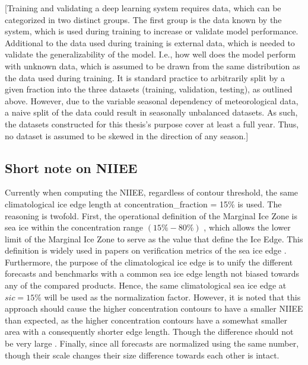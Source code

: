 [Training and validating a deep learning system requires data, which can be categorized in two distinct groups. The first group is the data known by the system, which is used during training to increase or validate model performance. Additional to the data used during training is external data, which is needed to validate the generalizability of the model. I.e., how well does the model perform with unknown data, which is assumed to be drawn from the same distribution as the data used during training. It is standard practice to arbitrarily split by a given fraction into the three datasets (training, validation, testing), as outlined above. However, due to the variable seasonal dependency of meteorological data, a naive split of the data could result in seasonally unbalanced datasets. As such, the datasets constructed for this thesis's purpose cover at least a full year. Thus, no dataset is assumed to be skewed in the direction of any season.] 

\subsection{Short note on NIIEE}

Currently when computing the NIIEE, regardless of contour threshold, the same climatological ice edge length at concentration\_fraction = 15\% is used. The reasoning is twofold. First, the operational definition of the Marginal Ice Zone is sea ice within the concentration range $(15\% - 80\%)$ \citep{Dumont2022}, which allows the lower limit of the Marginal Ice Zone to serve as the value that define the Ice Edge. This definition is widely used in papers on verification metrics of the sea ice edge \citep{Dukhovskoy2015,Goessling2016,Goessling2018,Melsom2019}. Furthermore, the purpose of the climatological ice edge is to unify the different forecasts and benchmarks with a common sea ice edge length not biased towards any of the compared products. Hence, the same climatological sea ice edge at $sic = 15\%$ will be used as the normalization factor. However, it is noted that this approach should cause the higher concentration contours to have a smaller NIIEE than expected, as the higher concentration contours have a somewhat smaller area with a consequently shorter edge length. Though the difference should not be very large . Finally, since all forecasts are normalized using the same number, though their scale changes their size difference towards each other is intact.

